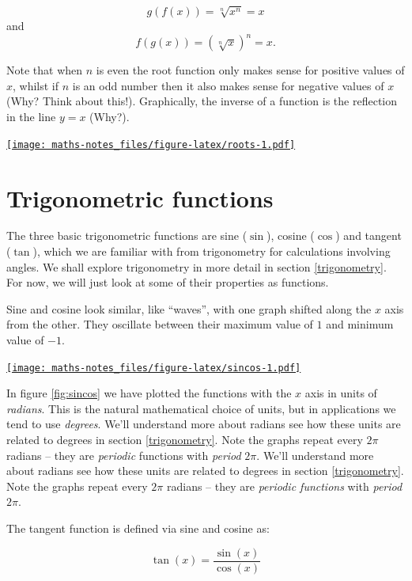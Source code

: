 \documentclass[
]{book}
\theoremstyle{definition}
\theoremstyle{definition}
\theoremstyle{definition}
\theoremstyle{definition}
\theoremstyle{remark}
\begin{document}
\[g(f(x)) = \sqrt[n]{x^n}=x\]
and
\[f(g(x)) = (\sqrt[n]{x})^n=x.\]

Note that when \(n\) is even the root function only makes sense for positive values of \(x\), whilst if \(n\) is an odd number then it also makes sense for negative values of \(x\) (Why? Think about this!). Graphically, the inverse of a function is the reflection in the line \(y=x\) (Why?).

\href{https://www.desmos.com/calculator/j3elzr5cks}{\texttt{[image: maths-notes\_files/figure-latex/roots-1.pdf]}}

\hypertarget{trigonometric-functions}{%
\section{Trigonometric functions}\label{trigonometric-functions}}

The three basic trigonometric functions are sine (\(\sin\)), cosine (\(\cos\)) and tangent (\(\tan\)), which we are familiar with from trigonometry for calculations involving angles. We shall explore trigonometry in more detail in section \ref{trigonometry}. For now, we will just look at some of their properties as functions.

Sine and cosine look similar, like ``waves'', with one graph shifted along the \(x\) axis from the other. They oscillate between their maximum value of \(1\) and minimum value of \(-1\).

\href{https://www.desmos.com/calculator/gyj6vrtzbu}{\texttt{[image: maths-notes\_files/figure-latex/sincos-1.pdf]}}

In figure \ref{fig:sincos} we have plotted the functions with the \(x\) axis in units of \emph{radians}. This is the natural mathematical choice of units, but in applications we tend to use \emph{degrees}. We'll understand more about radians see how these units are related to degrees in section \ref{trigonometry}. Note the graphs repeat every \(2\pi\) radians -- they are \emph{periodic} functions with \emph{period} \(2\pi\).
We'll understand more about radians see how these units are related to degrees in section \ref{trigonometry}. Note the graphs repeat every \(2\pi\) radians -- they are \emph{periodic functions} with \emph{period} \(2\pi\).

The tangent function is defined via sine and cosine as:

\begin{equation}
\tan(x)=\frac{\sin(x)}{\cos(x)}
\label{eq:tan}
\end{equation}
\end{document}

